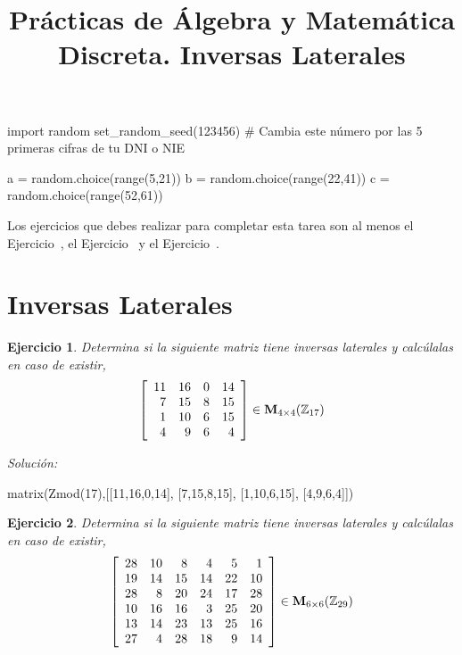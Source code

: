 \documentclass{amsart}
\title{Pr\'acticas de \'Algebra y Matem\'atica Discreta. Inversas Laterales}
\newtheorem{ejer}{Ejercicio}
\begin{document}
\maketitle

\begin{sagesilent}
import random
set_random_seed(123456) # Cambia este número por las 5 primeras cifras de tu DNI o NIE

a = random.choice(range(5,21))
b = random.choice(range(22,41))
c = random.choice(range(52,61))
\end{sagesilent}

\begin{tcolorbox}[colback = red!40!white]
Los ejercicios que debes realizar para completar esta tarea son al menos el Ejercicio~,
el Ejercicio~ y el Ejercicio~.
\end{tcolorbox}

\section{Inversas Laterales}

\begin{ejer} Determina si la siguiente matriz tiene inversas laterales y calc\'ulalas en caso de existir,
\[ \left[\begin{array}{rrrr}
11 & 16 & 0 & 14 \\
7 & 15 & 8 & 15 \\
1 & 10 & 6 & 15 \\
4 & 9 & 6 & 4
\end{array}\right] \in {\bf M}_{4\times 4}({\mathbb Z}_{17})\]
\end{ejer}

{\it Soluci\'on:}

\begin{sageblock}
matrix(Zmod(17),[[11,16,0,14],
[7,15,8,15],
[1,10,6,15],
[4,9,6,4]])
\end{sageblock}



\begin{ejer} Determina si la siguiente matriz tiene inversas laterales y calc\'ulalas en caso de existir,
\[ \left[\begin{array}{rrrrrr}
28 & 10 & 8 & 4 & 5 & 1 \\
19 & 14 & 15 & 14 & 22 & 10 \\
28 & 8 & 20 & 24 & 17 & 28 \\
10 & 16 & 16 & 3 & 25 & 20 \\
13 & 14 & 23 & 13 & 25 & 16 \\
27 & 4 & 28 & 18 & 9 & 14
\end{array}\right] \in {\bf M}_{6\times 6}({\mathbb Z}_{29})\]
\end{ejer}
\end{document}

